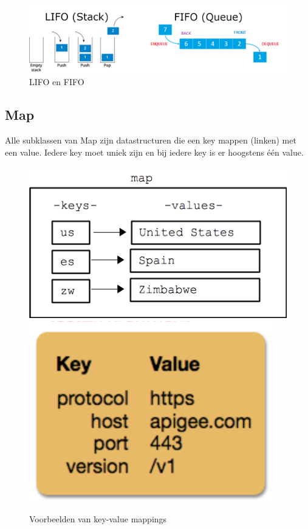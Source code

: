 \documentclass{tstextbook}
\begin{document}
\begin{figure}[H]
\includegraphics[width=\linewidth]{images/h3/fifo_lifo.png}
\caption{LIFO en FIFO}
\label{fig:fifo_lifo}
\end{figure}

\subsection{Map}

Alle subklassen van Map zijn datastructuren die een key mappen (linken) met een value. Iedere key moet uniek zijn en bij iedere key is er hoogstens \'e\'en value.

\begin{figure}[H]
\includegraphics{images/h3/key_value_map1.png}
\includegraphics{images/h3/key_value_map2.png}
\caption{Voorbeelden van key-value mappings}
\label{fig:key_value_mappings}
\end{figure}
\end{document}
